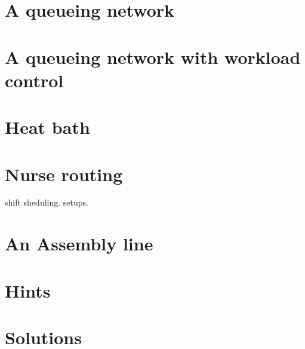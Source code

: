 \documentclass{scrartcl}
\begin{document}
\section{A queueing network}
\label{sec:queueing-network}


\section{A queueing network with workload control}
\label{sec:queu-netw-with}



\section{Heat bath}
\label{sec:heat-bath}

\section{Nurse routing}
\label{sec:nurse-routing}

shift sheduling. setups. 


\section{An Assembly line}
\label{sec:an-assembly-line}





\clearpage
\section*{Hints}


\clearpage
\section*{Solutions}

\end{document}
